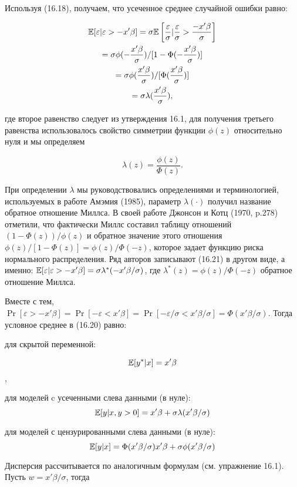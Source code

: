 Используя (16.18), получаем, что усеченное среднее случайной ошибки равно:

\begin{multline}
\mathbb{E}[\varepsilon|\varepsilon>{-x}'\beta]={\sigma}\mathbb{E}\left[\dfrac{\varepsilon}{\sigma}|\dfrac{\varepsilon}{\sigma}>\dfrac{{-x}'\beta}{\sigma}\right] \\
=\sigma\phi(-\dfrac{x'\beta}{\sigma})/[1-\Phi(-\dfrac{x'\beta}{\sigma})] \\
=\sigma\phi(\dfrac{x'\beta}{\sigma})/[\Phi(\dfrac{x'\beta}{\sigma})] \\
=\sigma\lambda(\dfrac{x'\beta}{\sigma}),
\end{multline}

где второе равенство следует из утверждения 16.1, для получения третьего равенства использовалось свойство симметрии функции $\phi(z)$ относительно нуля и мы определяем 

\begin{equation}
\lambda(z)=\dfrac{\phi(z)}{\Phi(z)}.
\end{equation}

При определении $\lambda$ мы руководствовались определениями и терминологией, используемых в работе Амэмия (1985), параметр $\lambda(\cdot )$ получил название обратное отношение Миллса. В своей работе Джонсон и Котц (1970, p.278) отметили, что фактически Миллс составил таблицу отношений $(1-\Phi(z))/\phi(z)$ и обратное значение этого отношения $\phi(z)/[1-\Phi(z)]=\phi(z)/\Phi(-z)$, которое задает функцию риска нормального распределения. Ряд авторов записывают (16.21) в другом виде, а именно: $\mathbb{E}[\varepsilon|\varepsilon>-x'\beta]=\sigma\lambda^{*}(-x'\beta/\sigma)$, где $\lambda^{*}(z)=\phi(z)/\Phi(-z)$ обратное отношение Миллса.

Вместе с тем, $\Pr[ \varepsilon>-x'\beta]=\Pr[ -\varepsilon<x'\beta]=\Pr[ -\varepsilon/\sigma<x'\beta/\sigma]=\Phi(x'\beta/\sigma)$. Тогда условное среднее в (16.20) равно:

для скрытой переменной: 

\begin{equation}
\mathbb{E}[y^* |x]=x'\beta
\end{equation},

для моделей c усеченными слева данными (в нуле): 
\[
\mathbb{E}[y|x,y>0]=x'\beta+\sigma\lambda(x'\beta/\sigma)
\]

для моделей с цензурированными слева данными (в нуле): 
\[
\mathbb{E}[y|x]=\Phi(x'\beta/\sigma)x'\beta+\sigma\phi(x'\beta/\sigma)
\]


Дисперсия рассчитывается по аналогичным формулам (см. упражнение 16.1). Пусть $w=x'\beta/\sigma$, тогда 

